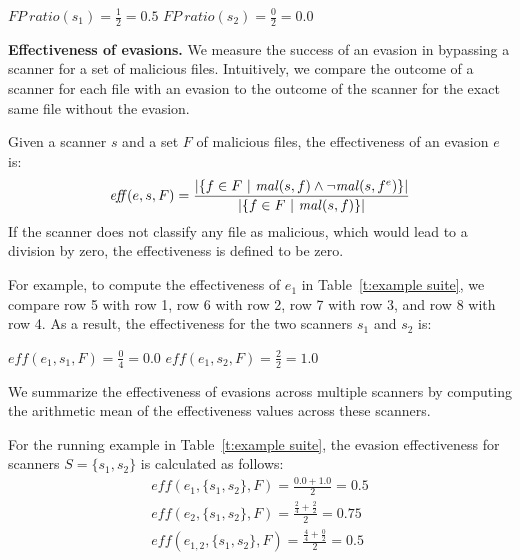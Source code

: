 \vspace{.5em}
{
\centering
$FP~ratio(s_1) = \frac{1}{2} = 0.5$ \hspace{2em} $FP~ratio(s_2) = \frac{0}{2} = 0.0$\\
}
\vspace{.5em}

\textbf{Effectiveness of evasions.} We measure the success of an evasion in bypassing a scanner for a set of malicious files.
Intuitively, we compare the outcome of a scanner for each file with an evasion to the outcome of the scanner for the exact same file without the evasion.

\begin{definition}
Given a scanner $s$ and a set $F$ of malicious files, the effectiveness of an evasion $e$ is:
$$
\mathit{eff}(e, s, F) = \frac
{|\{ f \in F ~|~ \mathit{mal}(s,f) \wedge \neg \mathit{mal}(s,f^{e}) \}|}
{|\{ f \in F ~|~ \mathit{mal}(s,f) \}|} \\
$$
If the scanner does not classify any file as malicious, which would lead to a division by zero, the effectiveness is defined to be zero.
\label{def: eff}
\end{definition}

For example, to compute the effectiveness of $e_{1}$ in Table~\ref{t:example suite}, we
compare row 5 with row 1, row 6 with row 2, row 7 with row 3, and row 8 with row 4.
As a result, the effectiveness for the two scanners $s_1$ and $s_2$ is:

\vspace{.5em}
{
	\centering
	$\mathit{eff}(e_{1}, s_1, F) = \frac{0}{4} = 0.0$
	\hspace{2em} 
	$\mathit{eff}(e_{1}, s_2, F) = \frac{2}{2} = 1.0$\\
}
\vspace{.5em}

We summarize the effectiveness of evasions across multiple scanners
by computing the arithmetic mean of the effectiveness values across these scanners.

For the running example in Table~\ref{t:example suite}, the evasion effectiveness for scanners $S=\{s_1,s_2\}$ is calculated as follows:
\begin{gather*}
\mathit{eff}(e_{1}, \{s_1, s_2\}, F) = \frac{0.0 + 1.0}{2} = 0.5 \\
\mathit{eff}(e_{2}, \{s_1, s_2\}, F) = \frac{\frac{2}{4} + \frac{2}{2}}{2} = 0.75 \\
\mathit{eff}(e_{1,2}, \{s_1, s_2\}, F) = \frac{\frac{4}{4} + \frac{0}{2}}{2} = 0.5
\end{gather*}

